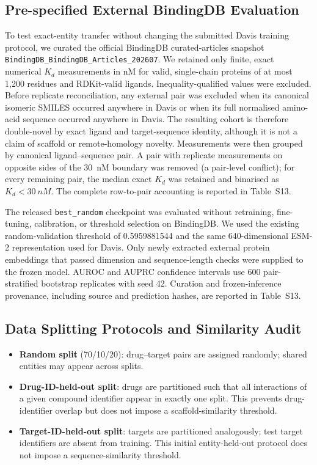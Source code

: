 \documentclass[fleqn,10pt]{wlscirep}
\begin{document}
\begingroup\color{red}
\subsection{Pre-specified External BindingDB Evaluation}

To test exact-entity transfer without changing the submitted Davis training
protocol, we curated the official BindingDB curated-articles snapshot
\texttt{BindingDB\_BindingDB\_Articles\_202607}\cite{gilson2016bindingdb}.
We retained only finite, exact numerical $K_d$ measurements in nM for valid,
single-chain proteins of at most 1{,}200 residues and RDKit-valid ligands.
Inequality-qualified values were excluded. Before replicate reconciliation, any
external pair was excluded when its canonical isomeric
SMILES occurred anywhere in Davis or when its full normalised amino-acid
sequence occurred anywhere in Davis. The resulting cohort is therefore
double-novel by exact ligand and target-sequence identity, although it is not a
claim of scaffold or remote-homology novelty. Measurements were then grouped by
canonical ligand--sequence pair. A pair with replicate measurements on opposite
sides of the \SI{30}{nM} boundary was removed (a pair-level conflict); for every
remaining pair, the median exact $K_d$ was retained and binarised as
$K_d<\SI{30}{nM}$. The complete row-to-pair accounting is reported in
Table~S13.

The released \texttt{best\_random} checkpoint was evaluated without retraining,
fine-tuning, calibration, or threshold selection on BindingDB. We used the
existing random-validation threshold of 0.5959881544 and the same
640-dimensional ESM-2 representation used for Davis. Only newly extracted
external protein embeddings that passed dimension and sequence-length checks
were supplied to the frozen model.
AUROC and AUPRC confidence intervals use 600 pair-stratified bootstrap
replicates with seed 42. Curation and frozen-inference provenance, including
source and prediction hashes, are reported in Table~S13.
\endgroup

\subsection{Data Splitting Protocols and Similarity Audit}

\begingroup\color{red}

\begin{itemize}[leftmargin=*]
\item \textbf{Random split} (70/10/20): drug--target pairs are assigned randomly;
  shared entities may appear across splits.
\item \textbf{Drug-ID-held-out split}: drugs are partitioned such that all interactions
  of a given compound identifier appear in exactly one split.  This prevents
  drug-identifier overlap but does not impose a scaffold-similarity threshold.
\item \textbf{Target-ID-held-out split}: targets are partitioned analogously; test
  target identifiers are absent from training.  This initial entity-held-out
  protocol does not impose a sequence-similarity threshold.
\end{itemize}
\end{document}
